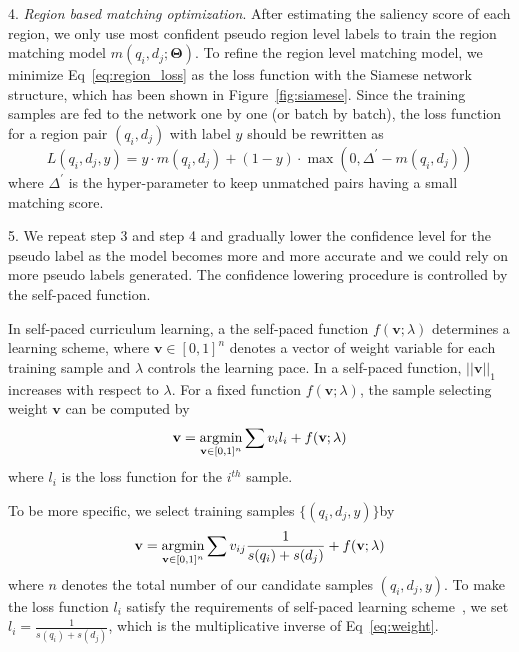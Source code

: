 4. \emph{Region based matching optimization}. After estimating the saliency score of each region, we only use most confident pseudo region level labels to train the region matching model $m(q_i, d_j; \mathbf{\Theta})$. 
To refine the region level matching model, we minimize Eq~\eqref{eq:region_loss} as the loss function with the Siamese network structure, which has been shown in Figure~\ref{fig:siamese}. 
Since the training samples are fed to the network one by one (or batch by batch), the loss function for a region pair $(q_i, d_j)$ with label $y$ should be rewritten as 
\begin{equation}
L(q_i, d_j, y) = y\cdot m(q_i, d_j) + (1-y)\cdot \max(0, \Delta^{'} - m(q_i,d_j))
\label{eq:region_loss_sum}
\end{equation} 
where $\Delta^{'}$ is the hyper-parameter to keep unmatched pairs having a small matching score. 

5. We repeat step 3 and step 4 and gradually lower the confidence level for the pseudo label as the model becomes more and more accurate and we could rely on more pseudo labels generated. 
The confidence lowering procedure is controlled by the self-paced function\cite{jiang2015self}. 

In self-paced curriculum learning, a the self-paced function $f(\mathbf{v};\lambda)$ determines a learning scheme, where $\mathbf{v}\in [0,1]^n$ denotes a vector of weight variable for each training sample and $\lambda$ controls the learning pace. 
In a self-paced function, $||\mathbf{v}||_1$ increases with respect to $\lambda$. For a fixed function $f(\mathbf{v};\lambda)$, the sample selecting weight $\mathbf{v}$ can be computed by
\begin{equation}
\mathbf{v} = \operatorname*{argmin}_{\mathbf{v}\in [0,1]^n}\sum v_il_i + f(\mathbf{v};\lambda)
\end{equation}
where $l_i$ is the loss function for the $i^{th}$ sample. 

To be more specific, we select training samples $\{(q_i, d_j, y)\}$by 
\begin{equation}
\mathbf{v} = \operatorname*{argmin}_{\mathbf{v}\in [0,1]^n}\sum v_{ij}\frac{1}{s(q_i) + s(d_j)} + f(\mathbf{v};\lambda)
\label{eq:sample_selection}
\end{equation}
where $n$ denotes the total number of our candidate samples $(q_i, d_j, y)$. To make the loss function $l_i$ satisfy the requirements of self-paced learning scheme~\cite{jiang2015self}, we set $l_i = \frac{1}{s(q_i) + s(d_j)} $, which is the multiplicative inverse of Eq~\eqref{eq:weight}.

